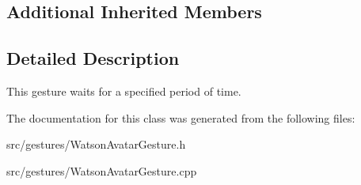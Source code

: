\subsection*{Additional Inherited Members}


\subsection{Detailed Description}
This gesture waits for a specified period of time. 

The documentation for this class was generated from the following files\+:\begin{DoxyCompactItemize}
\item 
src/gestures/Watson\+Avatar\+Gesture.\+h\item 
src/gestures/Watson\+Avatar\+Gesture.\+cpp\end{DoxyCompactItemize}
